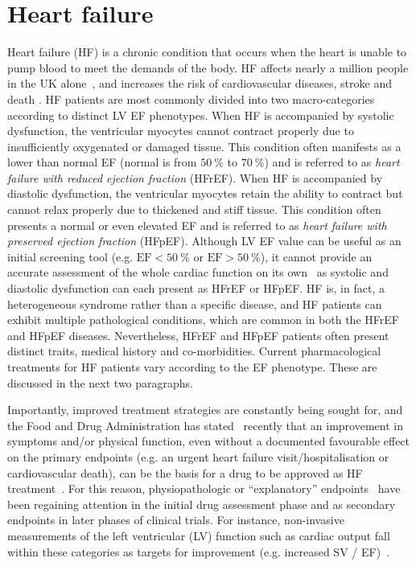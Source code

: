 %
%
%
\section{Heart failure}\label{sec:ch1heart_failure}
Heart failure (\acs{HF}) is a chronic condition that occurs when the heart is unable to pump blood to meet the demands of the body. HF affects nearly a million people in the UK alone~\cite{Bhf:2021}, and increases the risk of cardiovascular diseases, stroke and death \cite{Adelborg:2017, Henkel:2008}. HF patients are most commonly divided into two macro-categories according to distinct LV EF phenotypes. When HF is accompanied by systolic dysfunction, the ventricular myocytes cannot contract properly due to insufficiently oxygenated or damaged tissue. This condition often manifests as a lower than normal EF (normal is from $\SI{50}{\percent}$ to $\SI{70}{\percent}$) and is referred to as \textit{heart failure with reduced ejection fraction} (\acs{HFrEF}). When HF is accompanied by diastolic dysfunction, the ventricular myocytes retain the ability to contract but cannot relax properly due to thickened and stiff tissue. This condition often presents a normal or even elevated EF and is referred to as \textit{heart failure with preserved ejection fraction} (\acs{HFpEF}). Although LV EF value can be useful as an initial screening tool (e.g. $\textrm{EF}<\SI{50}{\percent}$ or $\textrm{EF}>\SI{50}{\percent}$), it cannot provide an accurate assessment of the whole cardiac function on its own~\cite{Guyton:2021} as systolic and diastolic dysfunction can each present as HFrEF or HFpEF. HF is, in fact, a heterogeneous syndrome rather than a specific disease, and HF patients can exhibit multiple pathological conditions, which are common in both the HFrEF and HFpEF diseases. Nevertheless, HFrEF and HFpEF patients often present distinct traits, medical history and co-morbidities. Current pharmacological treatments for HF patients vary according to the EF phenotype. These are discussed in the next two paragraphs.

\vspace{0.2cm}
Importantly, improved treatment strategies are constantly being sought for, and the Food and Drug Administration has stated~\cite{FDA:2019} recently that an improvement in symptoms and/or physical function, even without a documented favourable effect on the primary endpoints (e.g. an urgent heart failure visit/hospitalisation or cardiovascular death), can be the basis for a drug to be approved as HF treatment~\cite{Fiuzat:2020}. For this reason, physiopathologic or ``explanatory'' endpoints~\cite{Zanolla:2003} have been regaining attention in the initial drug assessment phase and as secondary endpoints in later phases of clinical trials. For instance, non-invasive measurements of the left ventricular (LV) function such as cardiac output fall within these categories as targets for improvement (e.g. increased SV / EF)~\cite{Zanolla:2003}.


